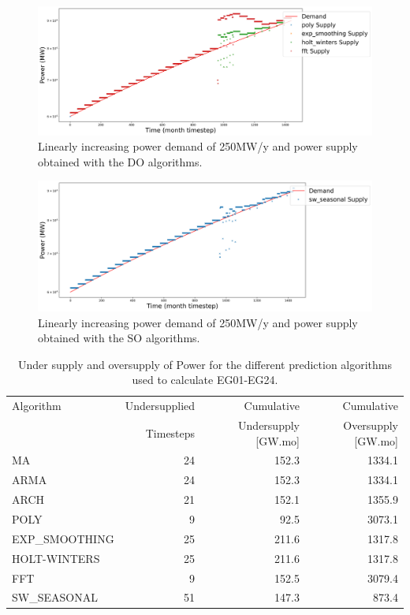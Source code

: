 \documentclass[11pt]{article}
\begin{document}
\begin{figure}[H]
	\centering
	\includegraphics[width=\textwidth]{30-figures/lin-30-power-buffer02.png} 
	\hfill
	\caption{Linearly increasing power demand of 250MW/y and power supply obtained with the DO algorithms.}
	\label{fig:30-lin-DO}
\end{figure}

\begin{figure}[H]
	\centering
	\includegraphics[width=\textwidth]{30-figures/lin-30-power-buffer03.png} 
	\hfill
	\caption{Linearly increasing power demand of 250MW/y and power supply obtained with the SO algorithms.}
	\label{fig:30-lin-SO}
\end{figure}

\begin{table}[H]
	\centering
	\caption{Under supply and oversupply of Power for the different prediction algorithms used to calculate EG01-EG24.}
	\label{tab:30-lin-power}
	\begin{tabularx}{\textwidth}{lRRR}
		\hline
		Algorithm & Undersupplied & Cumulative  & Cumulative \\
		& Timesteps     & Undersupply [GW.mo]  & Oversupply [GW.mo] \\ \hline
		MA        & 24 & 152.3 & 1334.1 \\ 
		ARMA      & 24 & 152.3 & 1334.1 \\ 
		ARCH      & 21 & 152.1 & 1355.9 \\ 
		POLY      &  9 & 92.5 & 3073.1 \\ 
		EXP\_SMOOTHING 	& 25 & 211.6 & 1317.8 \\ 
		HOLT-WINTERS  	& 25 & 211.6 & 1317.8 \\ 
		FFT       & 9 & 152.5 & 3079.4 \\ 
		SW\_SEASONAL  & 51 & 147.3 & 873.4 \\ \hline
	\end{tabularx}
\end{table}
\end{document}
